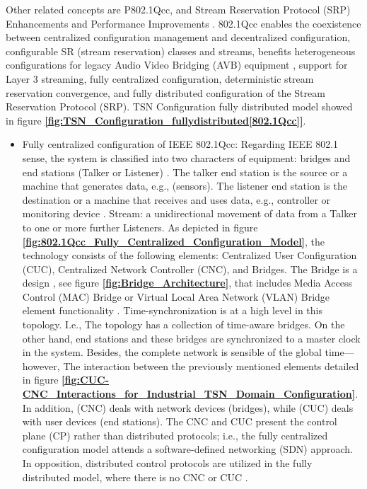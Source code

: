  
Other related concepts are P802.1Qcc, and Stream Reservation Protocol (SRP) Enhancements and Performance Improvements \cite{TSN2019_study}. 802.1Qcc enables the coexistence between centralized configuration management and decentralized configuration, configurable SR (stream reservation) classes and streams, benefits heterogeneous configurations for legacy Audio Video Bridging (AVB) equipment \cite{kreifeldt2009avb}, support for Layer 3 streaming, fully centralized configuration, deterministic stream reservation convergence, and fully distributed configuration of the Stream Reservation Protocol (SRP)\cite{TSN2019_study}. TSN Configuration fully distributed model showed in figure \textbf{\ref{fig:TSN_Configuration_fullydistributed[802.1Qcc]}}.
\begin{itemize}
    \item Fully centralized configuration of IEEE 802.1Qcc: Regarding IEEE 802.1 sense, the system is classified into two characters of equipment: bridges and end stations (Talker or Listener) \cite{TSN2019_study}.
    The talker end station is the source or a machine that generates data, e.g.,  (sensors). The listener end station is the destination or a machine that receives and uses data, e.g., controller or monitoring device \cite{Eri_Gar_Theo_Oper_TSN2017study}. Stream: a unidirectional movement of data from a Talker to one or more further Listeners. As depicted in 
    figure \textbf{\ref{fig:802.1Qcc_Fully_Centralized_Configuration_Model}},  the technology consists of the following elements: Centralized User Configuration (CUC), Centralized Network Controller (CNC), and Bridges. The Bridge is a design , see figure \textbf{\ref{fig:Bridge_Architecture}}, that includes Media Access Control (MAC) Bridge or Virtual Local Area Network (VLAN) Bridge element functionality \cite{Mannweiler2020}. Time-synchronization is at a high level in this topology. I.e., The topology has a collection of time-aware bridges. On the other hand, end stations and these bridges are synchronized to a master clock in the system. Besides, the complete network is sensible of the global time—however, The interaction between the previously mentioned elements detailed in figure \textbf{\ref{fig:CUC-CNC_Interactions_for_Industrial_TSN_Domain_Configuration}}. In addition, (CNC) deals with network devices (bridges), while (CUC) deals with user devices (end stations). The CNC and CUC present the control plane (CP) rather than distributed protocols; i.e., the fully centralized configuration model attends a software-defined networking (SDN) approach. In opposition, distributed control protocols are utilized in the fully distributed model, where there is no CNC or CUC \cite{Ericsson2019}.



\end{itemize}
